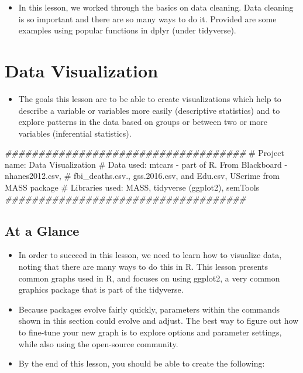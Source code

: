 \documentclass[
  letterpaper,
  DIV=11,
  numbers=noendperiod]{scrreprt}
\newenvironment{Shaded}{\begin{snugshade}}{\end{snugshade}}
\newcommand{\CommentTok}[1]{\textcolor[rgb]{0.37,0.37,0.37}{#1}}
\newcommand{\DocumentationTok}[1]{\textcolor[rgb]{0.37,0.37,0.37}{\textit{#1}}}
\providecommand{\tightlist}{%
  \setlength{\itemsep}{0pt}\setlength{\parskip}{0pt}}\usepackage{longtable,booktabs,array}
\begin{document}
\begin{itemize}
\tightlist
\item
  In this lesson, we worked through the basics on data cleaning. Data
  cleaning is so important and there are so many ways to do it. Provided
  are some examples using popular functions in dplyr (under tidyverse).
\end{itemize}


\chapter{Data Visualization}\label{data-visualization}

\begin{itemize}
\tightlist
\item
  The goals this lesson are to be able to create visualizations which
  help to describe a variable or variables more easily (descriptive
  statistics) and to explore patterns in the data based on groups or
  between two or more variables (inferential statistics).
\end{itemize}

\begin{Shaded}
\begin{Highlighting}[]
\DocumentationTok{\#\#\#\#\#\#\#\#\#\#\#\#\#\#\#\#\#\#\#\#\#\#\#\#\#\#\#\#\#\#\#\#\#\#\#\#}
\CommentTok{\# Project name: Data Visualization}
\CommentTok{\# Data used: mtcars {-} part of R. From Blackboard {-} nhanes2012.csv, }
\CommentTok{\# fbi\_deaths.csv., gss.2016.csv, and Edu.csv, UScrime from MASS package}
\CommentTok{\# Libraries used: MASS, tidyverse (ggplot2), semTools}
\DocumentationTok{\#\#\#\#\#\#\#\#\#\#\#\#\#\#\#\#\#\#\#\#\#\#\#\#\#\#\#\#\#\#\#\#\#\#\#\#}
\end{Highlighting}
\end{Shaded}

\section{At a Glance}\label{at-a-glance-2}

\begin{itemize}
\item
  In order to succeed in this lesson, we need to learn how to visualize
  data, noting that there are many ways to do this in R. This lesson
  presents common graphs used in R, and focuses on using ggplot2, a very
  common graphics package that is part of the tidyverse.
\item
  Because packages evolve fairly quickly, parameters within the commands
  shown in this section could evolve and adjust. The best way to figure
  out how to fine-tune your new graph is to explore options and
  parameter settings, while also using the open-source community.
\item
  By the end of this lesson, you should be able to create the following:
\end{itemize}
\end{document}

